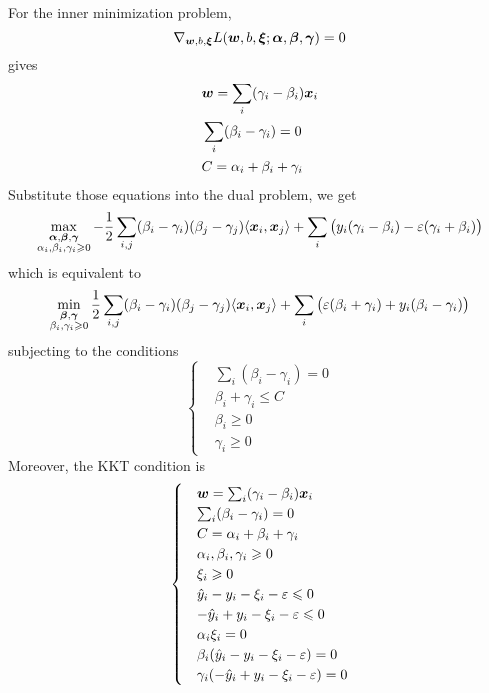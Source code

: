 For the inner minimization problem,
$$\nabla_{\boldsymbol{w}, b, \boldsymbol{\xi}}L(\boldsymbol{w}, b, \boldsymbol{\xi};\boldsymbol{\alpha}, \boldsymbol{\beta}, \boldsymbol{\gamma}) = 0$$
gives
\begin{subequations}
    \begin{align}
        &\boldsymbol{w} = \sum_i (\gamma_i - \beta_i) \boldsymbol{x}_i\\
        &\sum_i (\beta_i - \gamma_i) = 0\\
        &C = \alpha_i + \beta_i + \gamma_i
    \end{align}
\end{subequations}
Substitute those equations into the dual problem, we get
\begin{equation*}
    \max_{\substack{\boldsymbol{\alpha}, \boldsymbol{\beta}, \boldsymbol{\gamma}\\ \alpha_i, \beta_i, \gamma_i \geqslant 0}} 
    -\frac{1}{2}\sum_{i, j}(\beta_i - \gamma_i)(\beta_j - \gamma_j)
    \langle\boldsymbol{x}_i, \boldsymbol{x}_j\rangle + \sum_i \big(y_i(\gamma_i - \beta_i) - \varepsilon(\gamma_i + \beta_i)\big)
\end{equation*}
which is equivalent to
\begin{equation}
    \min_{\substack{\boldsymbol{\beta}, \boldsymbol{\gamma} \\ \beta_i, \gamma_i \geqslant 0}} \frac{1}{2}
    \sum_{i, j}(\beta_i - \gamma_i)(\beta_j - \gamma_j)
    \langle\boldsymbol{x}_i, \boldsymbol{x}_j\rangle + \sum_i \big(\varepsilon(\beta_i + \gamma_i) + y_i(\beta_i - \gamma_i)\big)
\end{equation}
subjecting to the conditions
\begin{equation*}
    \begin{cases}
        & \sum_i (\beta_i - \gamma_i) = 0\\
        & \beta_i + \gamma_i \leqslant C\\
        & \beta_i \geqslant 0\\
        & \gamma_i \geqslant 0
    \end{cases}
\end{equation*}
Moreover, the KKT condition is
\begin{equation}
    \begin{cases}
        &\boldsymbol{w} = \sum_i (\gamma_i - \beta_i) \boldsymbol{x}_i\\
        &\sum_i (\beta_i - \gamma_i) = 0\\
        &C = \alpha_i + \beta_i + \gamma_i\\
        &\alpha_i, \beta_i, \gamma_i \geqslant 0\\
        &\xi_i \geqslant 0\\
        &\hat{y}_i - y_i - \xi_i - \varepsilon \leqslant 0\\
        &-\hat{y}_i + y_i -\xi_i - \varepsilon \leqslant 0\\
        &\alpha_i \xi_i = 0\\
        &\beta_i (\hat{y}_i - y_i - \xi_i - \varepsilon) = 0\\
        &\gamma_i (-\hat{y}_i + y_i -\xi_i - \varepsilon) = 0
    \end{cases}
\end{equation}
